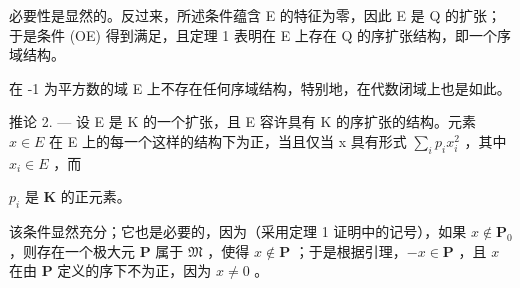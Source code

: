 必要性是显然的。反过来，所述条件蕴含 E 的特征为零，因此 E 是 Q 的扩张；于是条件 (OE) 得到满足，且定理 1 表明在 E 上存在 Q 的序扩张结构，即一个序域结构。

在 -1 为平方数的域 E 上不存在任何序域结构，特别地，在代数闭域上也是如此。

推论 2. --- 设 E 是 K 的一个扩张，且 E 容许具有 K 的序扩张的结构。元素 \(x \in E\) 在 E 上的每一个这样的结构下为正，当且仅当 x 具有形式 \(\sum_{i} p_{i} x_{i}^{2}\) ，其中 \(x_{i} \in E\) ，而

\(p_i\) 是 \(\mathbf{K}\) 的正元素。

该条件显然充分；它也是必要的，因为（采用定理 1 证明中的记号），如果 \(x \notin \mathbf{P}_0\) ，则存在一个极大元 \(\mathbf{P}\) 属于 \(\mathfrak{M}\) ，使得 \(x \notin \mathbf{P}\) ；于是根据引理，\(-x \in \mathbf{P}\) ，且 \(x\) 在由 \(\mathbf{P}\) 定义的序下不为正，因为 \(x \neq 0\) 。

